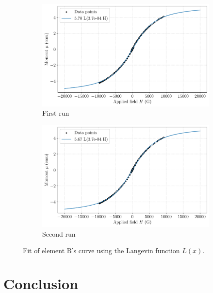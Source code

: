 \documentclass{../paper}
\begin{document}
\begin{figure}
  \centering
  \begin{subfigure}{\columnwidth}
    \centering
    \includegraphics[width=\textwidth]{data/aij-b-2-13-0-data-fit.pdf}
    \caption{First run}
    \label{fig:fit1}
  \end{subfigure}
  \begin{subfigure}{\columnwidth}
    \centering
    \includegraphics[width=\textwidth]{data/aij-b-2-13-1-data-fit.pdf}
    \caption{Second run}
    \label{fig:fit2}
  \end{subfigure}

  \caption{Fit of element B's curve using the Langevin function $L(x)$.}
  \label{fig:fits}
\end{figure}

\section{Conclusion}\label{sec:conclusion}
\end{document}
